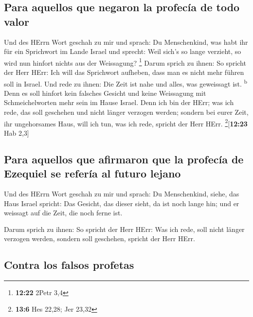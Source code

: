 \hypertarget{para-aquellos-que-negaron-la-profecuxeda-de-todo-valor}{%
\subsection{Para aquellos que negaron la profecía de todo
valor}\label{para-aquellos-que-negaron-la-profecuxeda-de-todo-valor}}

 Und des HErrn Wort geschah zu mir und sprach:
 Du Menschenkind, was habt ihr für ein Sprichwort im
Lande Israel und sprecht: Weil sich's so lange verzieht, so wird nun
hinfort nichts aus der Weissagung? \footnote{\textbf{12:22} 2Petr 3,4}
 Darum sprich zu ihnen: So spricht der Herr HErr: Ich
will das Sprichwort aufheben, dass man es nicht mehr führen soll in
Israel. Und rede zu ihnen: Die Zeit ist nahe und alles, was geweissagt
ist. \textsuperscript{b}  Denn es soll hinfort kein
falsches Gesicht und keine Weissagung mit Schmeichelworten mehr sein im
Hause Israel.  Denn ich bin der HErr; was ich rede, das
soll geschehen und nicht länger verzogen werden; sondern bei eurer Zeit,
ihr ungehorsames Haus, will ich tun, was ich rede, spricht der Herr
HErr. \footnote{\textbf{13:6} Hes 22,28; Jer 23,32}{[}\textbf{12:23} Hab
2,3{]}

\hypertarget{para-aquellos-que-afirmaron-que-la-profecuxeda-de-ezequiel-se-referuxeda-al-futuro-lejano}{%
\subsection{Para aquellos que afirmaron que la profecía de Ezequiel se
refería al futuro
lejano}\label{para-aquellos-que-afirmaron-que-la-profecuxeda-de-ezequiel-se-referuxeda-al-futuro-lejano}}

 Und des HErrn Wort geschah zu mir und sprach:
 Du Menschenkind, siehe, das Haus Israel spricht: Das
Gesicht, das dieser sieht, da ist noch lange hin; und er weissagt auf
die Zeit, die noch ferne ist.

 Darum sprich zu ihnen: So spricht der Herr HErr: Was ich
rede, soll nicht länger verzogen werden, sondern soll geschehen, spricht
der Herr HErr.

\hypertarget{contra-los-falsos-profetas}{%
\subsection{Contra los falsos
profetas}\label{contra-los-falsos-profetas}}

